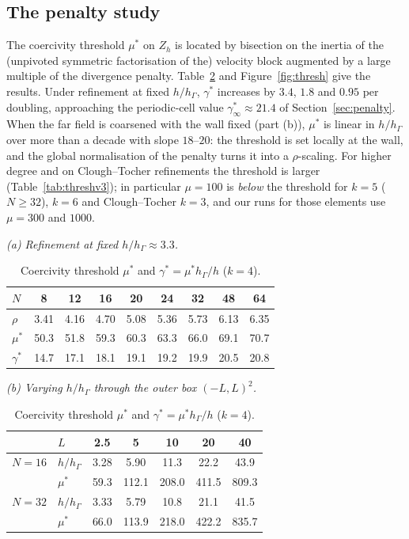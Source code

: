 \documentclass[pdflatex,sn-mathphys-num]{sn-jnl}
\theoremstyle{thmstyleone}
\theoremstyle{thmstylethree}
\newcommand{\hG}{h_\Gamma}
\newcommand{\Zh}{Z_h}
\begin{document}
\subsection{The penalty study}
The coercivity threshold $\mu^\ast$ on $\Zh$ is located by bisection on the inertia of the (unpivoted symmetric factorisation of the) velocity block augmented by a large multiple of the divergence penalty. Table~\ref{tab:thresh} and Figure~\ref{fig:thresh} give the results. Under refinement at fixed $h/\hG$, $\gamma^\ast$ increases by $3.4$, $1.8$ and $0.95$ per doubling, approaching the periodic-cell value $\gamma^\ast_\infty\approx21.4$ of Section~\ref{sec:penalty}. When the far field is coarsened with the wall fixed (part (b)), $\mu^\ast$ is linear in $h/\hG$ over more than a decade with slope $18$--$20$: the threshold is set locally at the wall, and the global normalisation of the penalty turns it into a $\rho$-scaling. For higher degree and on Clough--Tocher refinements the threshold is larger (Table~\ref{tab:threshv3}); in particular $\mu=100$ is \emph{below} the threshold for $k=5$ ($N\ge32$), $k=6$ and Clough--Tocher $k=3$, and our runs for those elements use $\mu=300$ and $1000$.

\begin{table}[t]
\centering\small
\caption{Coercivity threshold $\mu^\ast$ and $\gamma^\ast=\mu^\ast\hG/h$ ($k=4$).}\label{tab:thresh}
\textit{(a) Refinement at fixed $h/\hG\approx3.3$.}\\[2pt]
\begin{tabular}{lcccccccc}
\toprule
$N$ & 8 & 12 & 16 & 20 & 24 & 32 & 48 & 64\\
\midrule
$\rho$ & 3.41 & 4.16 & 4.70 & 5.08 & 5.36 & 5.73 & 6.13 & 6.35\\
$\mu^\ast$ & 50.3 & 51.8 & 59.3 & 60.3 & 63.3 & 66.0 & 69.1 & 70.7\\
$\gamma^\ast$ & 14.7 & 17.1 & 18.1 & 19.1 & 19.2 & 19.9 & 20.5 & 20.8\\
\bottomrule
\end{tabular}\par\vspace{6pt}
\textit{(b) Varying $h/\hG$ through the outer box $(-L,L)^2$.}\\[2pt]
\begin{tabular}{llccccc}
\toprule
 & $L$ & 2.5 & 5 & 10 & 20 & 40\\
\midrule
$N=16$ & $h/\hG$ & 3.28 & 5.90 & 11.3 & 22.2 & 43.9\\
 & $\mu^\ast$ & 59.3 & 112.1 & 208.0 & 411.5 & 809.3\\
\midrule
$N=32$ & $h/\hG$ & 3.33 & 5.79 & 10.8 & 21.1 & 41.5\\
 & $\mu^\ast$ & 66.0 & 113.9 & 218.0 & 422.2 & 835.7\\
\bottomrule
\end{tabular}
\end{table}
\end{document}
